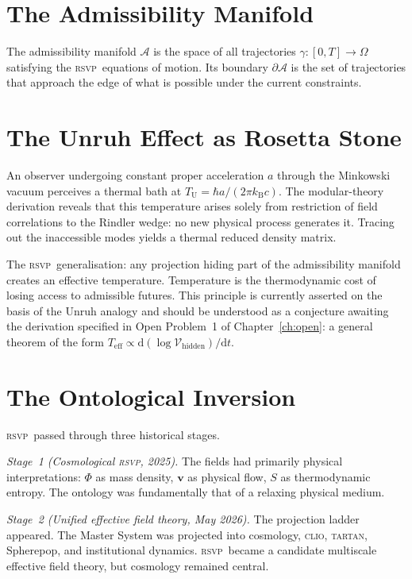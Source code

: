 \documentclass[12pt, oneside]{book}
\theoremstyle{plain}
\theoremstyle{definition}
\newcommand{\vfield}{\mathbf{v}}
\newcommand{\RSVP}{\textsc{rsvp}}
\newcommand{\CLIO}{\textsc{clio}}
\newcommand{\TARTAN}{\textsc{tartan}}
\newcommand{\dd}{\mathrm{d}}
\newcommand{\kB}{k_{\mathrm{B}}}
\newcommand{\Unruh}{T_{\mathrm{U}}}
\newcommand{\Vac}{\mathcal{V}}
\newcommand{\Adm}{\mathcal{A}}
\begin{document}
\section{The Admissibility Manifold}
\label{sec:admissibility}

The admissibility manifold $\Adm$ is the space of all trajectories $\gamma:[0,T]
\to \Omega$ satisfying the \RSVP\ equations of motion. Its boundary $\partial\Adm$
is the set of trajectories that approach the edge of what is possible under the
current constraints.

\section{The Unruh Effect as Rosetta Stone}
\label{sec:unruh}

An observer undergoing constant proper acceleration $a$ through the Minkowski vacuum
perceives a thermal bath at
$\Unruh = \hbar a/(2\pi \kB c)$.
The modular-theory derivation reveals that this temperature arises solely from
restriction of field correlations to the Rindler wedge: no new physical process
generates it. Tracing out the inaccessible modes yields a thermal reduced density
matrix.

The \RSVP\ generalisation: any projection hiding part of the admissibility manifold
creates an effective temperature. Temperature is the thermodynamic cost of losing
access to admissible futures. This principle is currently asserted on the basis of
the Unruh analogy and should be understood as a conjecture awaiting the derivation
specified in Open Problem~1 of Chapter~\ref{ch:open}: a general theorem of the form
$T_{\mathrm{eff}} \propto \dd(\log\Vac_{\mathrm{hidden}})/\dd t$.

\section{The Ontological Inversion}
\label{sec:inversion}

\RSVP\ passed through three historical stages.

\textit{Stage~1 (Cosmological \RSVP, 2025).} The fields had primarily physical
interpretations: $\Phi$ as mass density, $\vfield$ as physical flow, $S$ as
thermodynamic entropy. The ontology was fundamentally that of a relaxing physical
medium.

\textit{Stage~2 (Unified effective field theory, May 2026).} The projection ladder
appeared. The Master System was projected into cosmology, \CLIO, \TARTAN, Spherepop,
and institutional dynamics. \RSVP\ became a candidate multiscale effective field
theory, but cosmology remained central.
\end{document}
